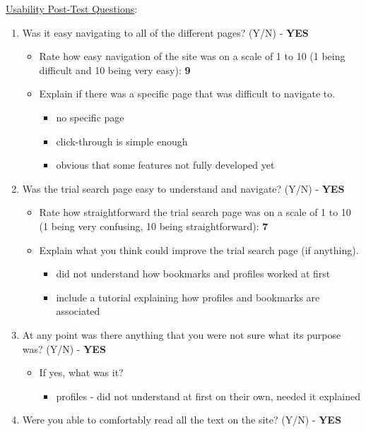 \documentclass[12pt]{article}
\begin{document}
\noindent \underline{Usability Post-Test Questions}:
\begin{enumerate}
  \item Was it easy navigating to all of the different pages? (Y/N) - \textbf{YES}
    \begin{itemize}
      \item Rate how easy navigation of the site was on a scale of 1 to 10 (1 being difficult and 10 being very easy): \textbf{9}
      \item Explain if there was a specific page that was difficult to navigate to.
      \begin{itemize}
        \item no specific page
        \item click-through is simple enough
        \item obvious that some features not fully developed yet
      \end{itemize}
    \end{itemize}
	\item Was the trial search page easy to understand and navigate? (Y/N) - \textbf{YES}
    \begin{itemize}
      \item Rate how straightforward the trial search page was on a scale of 1 to 10 (1 being very confusing, 10 being straightforward): \textbf{7}
      \item Explain what you think could improve the trial search page (if anything).
      \begin{itemize}
        \item did not understand how bookmarks and profiles worked at first
        \item include a tutorial explaining how profiles and bookmarks are associated
      \end{itemize}
    \end{itemize}
  \item At any point was there anything that you were not sure what its purpose was? (Y/N) - \textbf{YES}
    \begin{itemize}
      \item If yes, what was it?
      \begin{itemize}
        \item profiles - did not understand at first on their own, needed it explained
      \end{itemize}
    \end{itemize}
  \item Were you able to comfortably read all the text on the site? (Y/N) - \textbf{YES}

\end{enumerate}
\end{document}
